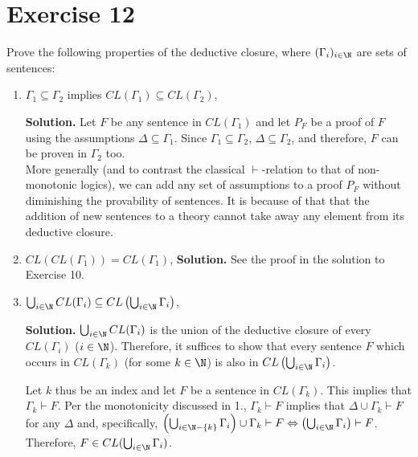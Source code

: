 \section{Exercise 12}

Prove the following properties of the deductive closure, where $(\Gamma_i)_{i \in \N}$ are sets of sentences:

\begin{enumerate}
	\item $\Gamma_1 \subseteq \Gamma_2$ implies $CL(\Gamma_1) \subseteq CL(\Gamma_2)$,
	
	\textbf{Solution.} Let $F$ be any sentence in $CL(\Gamma_1)$ and let $P_F$ be a proof of $F$ using the assumptions $\Delta \subseteq \Gamma_1$. Since $\Gamma_1 \subseteq \Gamma_2$, $\Delta \subseteq \Gamma_2$, and therefore, $F$ can be proven in $\Gamma_2$ too.\\
	
	More generally (and to contrast the classical $\vdash$-relation to that of non-monotonic logics), we can add any set of assumptions to a proof $P_F$ without diminishing the provability of sentences. It is because of that that the addition of new sentences to a theory cannot take away any element from its deductive closure.
	
	\item $CL(CL(\Gamma_1)) = CL(\Gamma_1)$, \textbf{Solution.} See the proof in the solution to Exercise 10.
	
	\item $\bigcup_{i \in \N} CL(\Gamma_i) \subseteq CL\left(\bigcup_{i \in \N} \Gamma_i\right)$,
	
	\textbf{Solution.} $\bigcup_{i \in \N} CL(\Gamma_i)$ is the union of the deductive closure of every $CL(\Gamma_i)$ ($i \in \N$). Therefore, it suffices to show that every sentence $F$ which occurs in $CL(\Gamma_k)$ (for some $k \in \N$) is also in $CL\left(\bigcup_{i \in \N} \Gamma_i\right)$.
	
	Let $k$ thus be an index and let $F$ be a sentence in $CL(\Gamma_k)$. This implies that $\Gamma_k \vdash F$. Per the monotonicity discussed in 1., $\Gamma_k \vdash F$ implies that $\Delta \cup \Gamma_k \vdash F$ for any $\Delta$ and, specifically, $\left(\bigcup_{i \in \N - \{k\}} \Gamma_i\right) \cup \Gamma_k \vdash F \Leftrightarrow \left(\bigcup_{i \in \N} \Gamma_i\right) \vdash F$. Therefore, $F \in CL(\bigcup_{i \in \N}\Gamma_i)$.
\end{enumerate}


